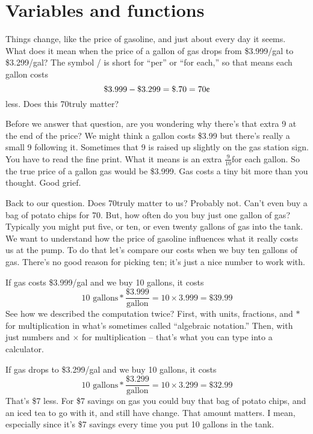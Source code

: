 
\section{Variables and functions}

Things change, like the price of gasoline, and just about every day it seems.  What does it mean when the price of a gallon of gas drops from \$3.999/gal to \$3.299/gal?  The symbol / is short for ``per'' or ``for each,''  so that means each gallon costs
$$\$3.999-\$3.299=\$.70 = 70\text{\textcent}$$ less.  Does this 70\textcent \hspace{.05in}truly matter?

Before we answer that question, are you wondering why there's that extra 9 at the end of the price?  We might think a gallon costs \$3.99 but there's really a small 9 following it.  Sometimes that 9 is raised up slightly on the gas station sign.  You have to read the fine print.  What it means is an extra $ \frac{9}{10}$\textcent \hspace{.05in}for each gallon.  So the true price of a gallon gas would be \$3.999.  Gas costs a tiny bit more than you thought.  Good grief.


Back to our question.  Does 70\textcent \hspace{.05in}truly matter to us?  Probably not.  Can't even buy a bag of potato chips for 70\textcent.  But, how often do you buy just one gallon of gas?  Typically you might put five, or ten, or even twenty gallons of gas into the tank.  We want to understand how the price of gasoline influences what it really costs us at the pump.  To do that let's compare our costs when we buy ten gallons of gas.  There's no good reason for picking ten; it's just a nice number to work with.

If gas costs \$3.999/gal and we buy 10 gallons, it costs 
$$10 \text{ gallons} \ast \frac{\$3.999}{\text{gallon}} = 10 \times 3.999  = \$39.99$$   
See how we described the computation twice?  First, with units, fractions, and $\ast$ for multiplication in what's sometimes called ``algebraic notation.''  Then, with just numbers and $\times$ for multiplication -- that's what you can type into a calculator.  %

 If gas drops to \$3.299/gal and we buy 10 gallons, it costs 
$$10 \text{ gallons} \ast \frac{\$3.299}{\text{gallon}} = 10 \times 3.299  = \$32.99$$
That's \$7 less.  For \$7 savings on gas you could buy that bag of potato chips, and an iced tea to go with it, and still have change. That amount matters.  I mean, especially since it's \$7 savings every time you put 10 gallons in the tank.

